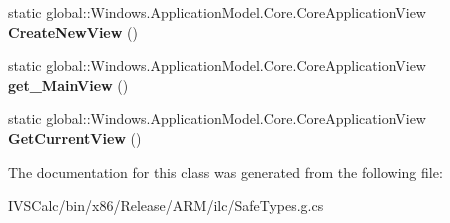 \begin{DoxyCompactItemize}
static global\+::\+Windows.\+Application\+Model.\+Core.\+Core\+Application\+View {\bfseries Create\+New\+View} ()
\item 
\mbox{\label{class_windows_1_1_application_model_1_1_core_1_1_core_application_a1dc848a12769626943e8ba6adec479e6}} 
static global\+::\+Windows.\+Application\+Model.\+Core.\+Core\+Application\+View {\bfseries get\+\_\+\+Main\+View} ()
\item 
\mbox{\label{class_windows_1_1_application_model_1_1_core_1_1_core_application_ab4ec88df76ae8ee8183735b12e8090bf}} 
static global\+::\+Windows.\+Application\+Model.\+Core.\+Core\+Application\+View {\bfseries Get\+Current\+View} ()
\end{DoxyCompactItemize}


The documentation for this class was generated from the following file\+:\begin{DoxyCompactItemize}
\item 
I\+V\+S\+Calc/bin/x86/\+Release/\+A\+R\+M/ilc/Safe\+Types.\+g.\+cs\end{DoxyCompactItemize}
